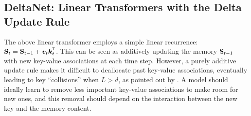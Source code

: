 \vspace{-1mm}
\subsection{DeltaNet: Linear Transformers with the Delta Update Rule}
\vspace{-1mm}
\label{ssec:deltanet}

The above linear transformer employs a simple linear recurrence: $\rmS_{t} = \rmS_{t-1} + \vv_t\vk_t^\intercal$. This can be seen as additively updating the memory ${\mathbf{S}}_{t-1}$ with new key-value associations  at each time step.
However, a purely additive update rule makes it difficult to deallocate past key-value associations, eventually leading to key ``collisions'' when $L > d$, as pointed out by \citet{schlag_linear_2021}. A model should ideally learn to remove less important key-value associations to make room for new ones, and this removal should depend on the interaction between the new key and the memory content.

